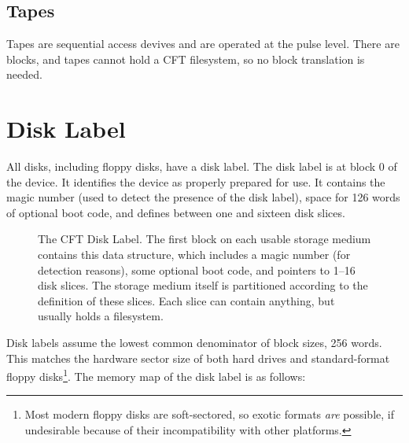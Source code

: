 \subsection{Tapes}

Tapes are sequential access devives and are operated at the pulse level. There
are blocks, and tapes cannot hold a CFT filesystem, so no block translation is
needed.

\section{Disk Label}
\label{sec:disk-label}
\label{sec:disklabel}
\label{sec:disk-slices}

All disks, including floppy disks, have a \gls{disk label}. The disk
label is at block 0 of the device. It identifies the device as
properly prepared for use. It contains the magic number
\magicDiskLabel (used to detect the presence of the disk label), space
for 126 words of optional boot code, and defines between one and
sixteen \glspl{disk slice}.

\begin{figure}
 \centering

 \caption[Disk Label]{\label{fig:storage-medium-organisation} The CFT
   Disk Label. The first block on each usable storage medium contains
   this data structure, which includes a magic number (for detection
   reasons), some optional boot code, and pointers to 1–16 \glspl{disk
     slice}. The storage medium itself is partitioned according to the
   definition of these slices. Each slice can contain anything, but
   usually holds a \gls{filesystem}.}
\end{figure}

Disk labels assume the lowest common denominator of block sizes, 256
words. This matches the hardware sector size of both hard drives and
standard-format floppy disks\footnote{Most modern floppy disks are
  soft-sectored, so exotic formats {\em are\/} possible, if undesirable
  because of their incompatibility with other platforms.}. The memory
map of the disk label is as follows:

